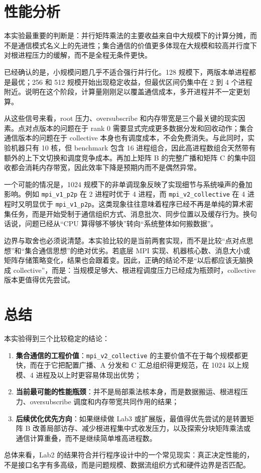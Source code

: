 \documentclass[UTF8,a4paper,12pt,fontset=none]{ctexart}
\begin{document}
\section{性能分析}

本实验最重要的判断是：并行矩阵乘法的主要收益来自中大规模下的计算分摊，而不是通信模式名义上的先进性；集合通信的价值更多体现在大规模和较高并行度下对根进程压力的缓解，而不是全程无条件更快。

已经确认的是，小规模问题几乎不适合强行并行化。128 规模下，两版本单进程都是最优；256 和 512 规模开始出现稳定收益，但最优区间仍集中在 2 到 4 个进程附近。说明在这个阶段，计算量刚刚足以覆盖通信成本，多开进程并不一定更划算。

从这些信号来看，root 压力、oversubscribe 和内存带宽是三个最关键的现实因素。点对点版本的问题在于 rank 0 需要显式完成更多数据分发和回收动作；集合通信版本的问题在于 collective 本身也有调度成本，不会免费消失。与此同时，实验机器只有 10 核，但 benchmark 包含 16 进程组合，因此高进程数组合天然带有额外的上下文切换和调度竞争成本。再加上矩阵 B 的完整广播和矩阵 C 的集中回收都会消耗内存带宽，因此效率下降是预期内而不是偶然异常。

一个可能的情况是，1024 规模下的非单调现象反映了实现细节与系统噪声的叠加影响。例如 \texttt{mpi\_v1\_p2p} 在 2 进程时优于 4 进程，而 \texttt{mpi\_v2\_collective} 在 4 进程时又明显优于 \texttt{mpi\_v1\_p2p}。这类现象往往意味着程序已经不再是单纯的算术密集任务，而是开始受制于通信组织方式、消息批次、同步位置以及缓存行为。换句话说，问题已经从“CPU 算得够不够快”转向“系统整体如何搬数据”。

边界与取舍也必须说清楚。本实验比较的是当前两套实现，而不是比较“点对点思想”和“集合通信思想”的绝对优劣。若底层 MPI 实现、机器核心数、消息大小或矩阵存储策略变化，结果也会跟着变。因此，正确的结论不是“以后都应该无脑换成 collective”，而是：当规模足够大、根进程调度压力已经成为瓶颈时，collective 版本更值得优先尝试。

\section{总结}

本实验得到三个比较稳定的结论：

\begin{enumerate}[leftmargin=2.2em]
  \item \textbf{集合通信的工程价值}：\texttt{mpi\_v2\_collective} 的主要价值不在于每个规模都更快，而在于它把配置广播、A 分发和 C 汇总组织得更规范，在 1024 以上规模、4 进程及以上时更容易体现出优势；
  \item \textbf{当前最可能的性能瓶颈}：并不是局部乘法核本身，而是数据搬运、根进程压力、oversubscribe 调度和内存带宽共同作用的结果；
  \item \textbf{后续优化优先方向}：如果继续做 Lab3 或扩展版，最值得优先尝试的是转置矩阵 B 改善局部访存、减少根进程集中式收发压力，以及探索分块矩阵乘法或通信计算重叠，而不是继续简单堆高进程数。
\end{enumerate}

总体来看，Lab2 的结果符合并行程序设计中的一个常见现实：真正决定性能的，不是接口名字有多高级，而是问题规模、数据流组织方式和硬件边界是否匹配。
\end{document}
